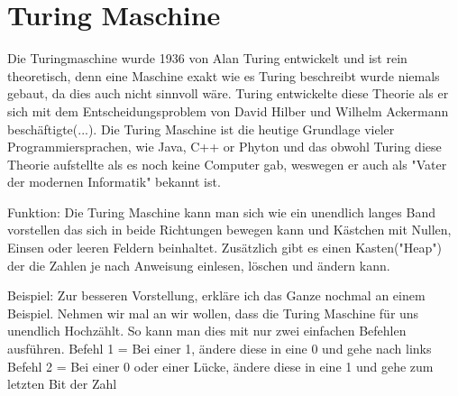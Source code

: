 \section{Turing Maschine}
Die Turingmaschine wurde 1936 von Alan Turing entwickelt und ist rein theoretisch, denn eine Maschine exakt wie es Turing beschreibt wurde niemals gebaut, da dies auch nicht sinnvoll wäre. Turing entwickelte diese Theorie als er sich mit dem Entscheidungsproblem von David Hilber und Wilhelm Ackermann beschäftigte(...). Die Turing Maschine ist die heutige Grundlage vieler Programmiersprachen, wie Java, C++ or Phyton und das obwohl Turing diese Theorie aufstellte als es noch keine Computer gab, weswegen er auch als "Vater der modernen Informatik" bekannt ist.

Funktion: Die Turing Maschine kann man sich wie ein unendlich langes Band vorstellen das sich in beide Richtungen bewegen kann und Kästchen mit Nullen, Einsen oder leeren Feldern beinhaltet. Zusätzlich gibt es einen Kasten("Heap") der die Zahlen je nach Anweisung einlesen, löschen und ändern kann.

Beispiel: Zur besseren Vorstellung, erkläre ich das Ganze nochmal an einem Beispiel. Nehmen wir mal an wir wollen, dass die Turing Maschine für uns unendlich Hochzählt. So kann man dies mit nur zwei einfachen Befehlen ausführen. 
Befehl 1 = Bei einer 1, ändere diese in eine 0 und gehe nach links
Befehl 2 = Bei einer 0 oder einer Lücke, ändere diese in eine 1 und gehe zum letzten Bit der Zahl
